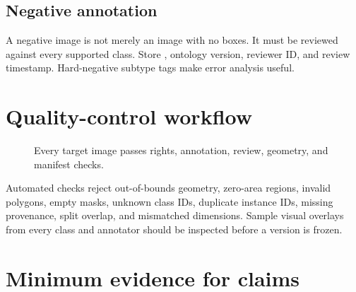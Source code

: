 \subsection{Negative annotation}

A negative image is not merely an image with no boxes. It must be reviewed against every supported class. Store , ontology version, reviewer ID, and review timestamp. Hard-negative subtype tags make error analysis useful.

\section{Quality-control workflow}

\begin{figure}[htbp]
\centering
{}
\caption{Every target image passes rights, annotation, review, geometry, and manifest checks.}
\end{figure}

Automated checks reject out-of-bounds geometry, zero-area regions, invalid polygons, empty masks, unknown class IDs, duplicate instance IDs, missing provenance, split overlap, and mismatched dimensions. Sample visual overlays from every class and annotator should be inspected before a version is frozen.

\section{Minimum evidence for claims}

